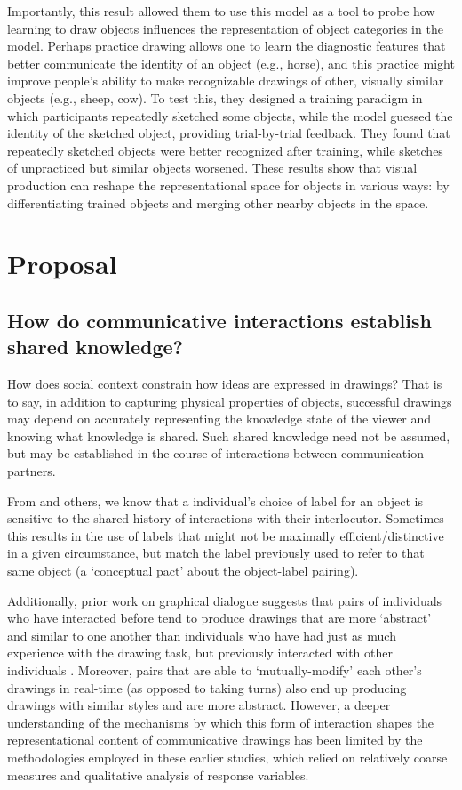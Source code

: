 \documentclass[12pt]{article}
\begin{document}
Importantly, this result allowed them to use this model as a tool to probe how learning to draw objects influences the representation of object categories in the model. Perhaps practice drawing allows one to learn the diagnostic features that better communicate the identity of an object (e.g., horse), and this practice might improve people's ability to make recognizable drawings of other, visually similar objects (e.g., sheep, cow). To test this, they designed a training paradigm in which participants repeatedly sketched some objects, while the model guessed the identity of the sketched object, providing trial-by-trial feedback. They found that repeatedly sketched objects were better recognized after training, while sketches of unpracticed but similar objects worsened. These results show that visual production can reshape the representational space for objects in various ways: by differentiating trained objects and merging other nearby objects in the space.

\section{Proposal}

\subsection{How do communicative interactions establish shared knowledge?}

How does social context constrain how ideas are expressed in drawings? That is to say, in addition to capturing physical properties of objects, successful drawings may depend on accurately representing the knowledge state of the viewer and knowing what knowledge is shared. Such shared knowledge need not be assumed, but may be established in the course of interactions between communication partners.

From  and others, we know that a individual's choice of label for an object is sensitive to the shared history of interactions with their interlocutor. Sometimes this results in the use of labels that might not be maximally efficient/distinctive in a given circumstance, but match the label previously used to refer to that same object (a ‘conceptual pact’ about the object-label pairing). 

Additionally, prior work on graphical dialogue suggests that pairs of individuals who have interacted before tend to produce drawings that are more `abstract' and similar to one another than individuals who have had just as much experience with the drawing task, but previously interacted with other individuals \cite{Healey:2007vq}. Moreover, pairs that are able to `mutually-modify' each other's drawings in real-time (as opposed to taking turns) also end up producing drawings with similar styles and are more abstract. However, a deeper understanding of the mechanisms by which this form of interaction shapes the representational content of communicative drawings has been limited by the methodologies employed in these earlier studies, which relied on relatively coarse measures and qualitative analysis of response variables. 
\end{document}
